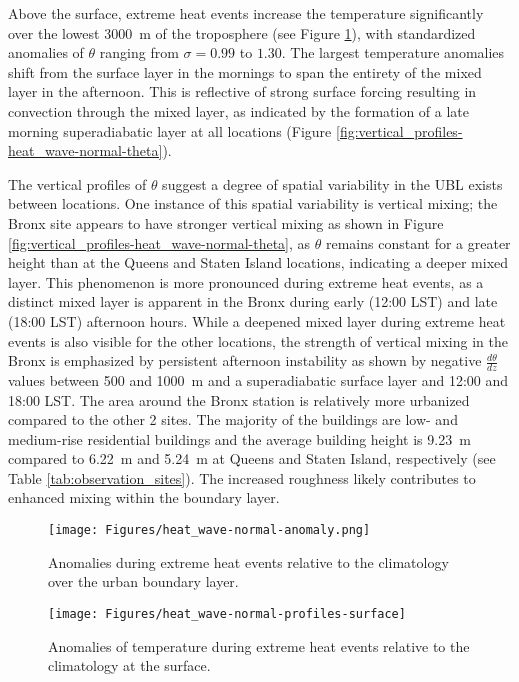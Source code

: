 Above the surface, extreme heat events increase the temperature significantly over the lowest \SI{3000}{\meter} of the troposphere (see Figure \ref{fig:extreme-heat-normal-comparison-contours}), with standardized anomalies of $\theta$ ranging from $\sigma = 0.99$ to $1.30$. The largest temperature anomalies shift from the surface layer in the mornings to span the entirety of the mixed layer in the afternoon. This is reflective of strong surface forcing resulting in convection through the mixed layer, as indicated by the formation of a late morning superadiabatic layer at all locations (Figure \ref{fig:vertical_profiles-heat_wave-normal-theta}). 

The vertical profiles of $\theta$ suggest a degree of spatial variability in the UBL exists between locations. One instance of this spatial variability is vertical mixing; the Bronx site appears to have stronger vertical mixing as shown in Figure \ref{fig:vertical_profiles-heat_wave-normal-theta}, as $\theta$ remains constant for a greater height than at the Queens and Staten Island locations, indicating a deeper mixed layer. This phenomenon is more pronounced during extreme heat events, as a distinct mixed layer is apparent in the Bronx during early (12:00 LST) and late (18:00 LST) afternoon hours. While a deepened mixed layer during extreme heat events is also visible for the other locations, the strength of vertical mixing in the Bronx is emphasized by persistent afternoon instability as shown by negative $\frac{d\theta}{dz}$ values between 500 and \SI{1000}{\meter} and a superadiabatic surface layer and 12:00 and 18:00 LST. The area around the Bronx station is relatively more urbanized compared to the other 2 sites. The majority of the buildings are low- and medium-rise residential buildings and the average building height is \SI{9.23}{\meter} compared to \SI{6.22}{\meter} and  \SI{5.24}{\meter} at Queens and Staten Island, respectively (see Table \ref{tab:observation_sites}). The increased roughness likely contributes to enhanced mixing within the boundary layer.

\begin{figure}[ht]
	\centering
	\texttt{[image: Figures/heat\_wave-normal-anomaly.png]}
	\caption{Anomalies during extreme heat events relative to the climatology over the urban boundary layer.}
	\label{fig:extreme-heat-normal-comparison-contours}
\end{figure}

\begin{figure}[ht]
	\centering
	\texttt{[image: Figures/heat\_wave-normal-profiles-surface]}
	\caption{Anomalies of temperature during extreme heat events relative to the climatology at the surface.}
	\label{fig:extreme-heat-normal-comparison-surface}
\end{figure}

